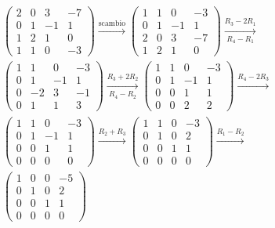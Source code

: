 \begin{example}
    \begin{gather*}
        \begin{pmatrix}
            2 & 0 & 3 & -7 \\
            0 & 1 & -1 & 1 \\
            1 & 2 & 1 & 0 \\
            1 & 1 & 0 & -3
        \end{pmatrix} \xrightarrow[]{\text{scambio}}
        \begin{pmatrix}
            1 & 1 & 0 & -3\\
            0 & 1 & -1 & 1 \\
            2 & 0 & 3 & -7 \\
            1 & 2 & 1 & 0             
        \end{pmatrix} \xrightarrow[R_4 - R_1]{R_3 - 2R_1} \\
        \begin{pmatrix}
            1 & 1 & 0 & -3\\            
            0 & 1 & -1 & 1 \\
            0 & -2 & 3 & -1 \\
            0 & 1 & 1 & 3            
        \end{pmatrix} \xrightarrow[R_4 - R_2]{R_3 + 2R_2}
        \begin{pmatrix}
            1 & 1 & 0 & -3\\            
            0 & 1 & -1 & 1 \\
            0 & 0 & 1 & 1 \\
            0 & 0 & 2 & 2            
        \end{pmatrix} \xrightarrow[]{R_4 -2R_3}\\
        \begin{pmatrix}
            1 & 1 & 0 & -3\\            
            0 & 1 & -1 & 1 \\
            0 & 0 & 1 & 1 \\
            0 & 0 & 0 & 0            
        \end{pmatrix} \xrightarrow[]{R_2 + R_3}
        \begin{pmatrix}
            1 & 1 & 0 & -3\\            
            0 & 1 & 0 & 2 \\
            0 & 0 & 1 & 1 \\
            0 & 0 & 0 & 0            
        \end{pmatrix} \xrightarrow[]{R_1 - R_2}\\
        \begin{pmatrix}
            1 & 0 & 0 & -5\\            
            0 & 1 & 0 & 2 \\
            0 & 0 & 1 & 1 \\
            0 & 0 & 0 & 0            
        \end{pmatrix}
    \end{gather*}


\end{example}
